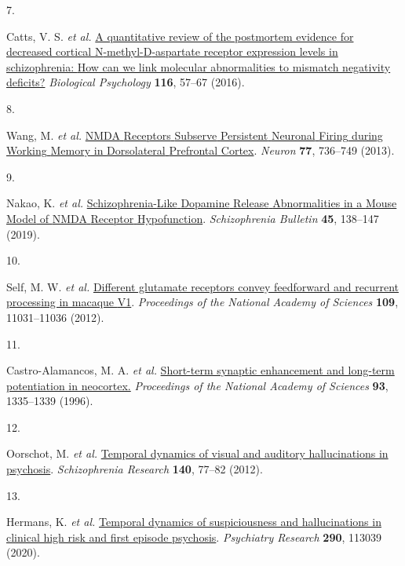 \documentclass[
]{article}
\newlength{\cslhangindent}
\newlength{\csllabelwidth}
\newlength{\cslentryspacingunit} %
\newenvironment{CSLReferences}[2] %
 {%
  \setlength{\parindent}{0pt}
  \ifodd #1
  \let\oldpar\par
  \def\par{\hangindent=\cslhangindent\oldpar}
  \fi
  \setlength{\parskip}{#2\cslentryspacingunit}
 }%
 {}
\newcommand{\CSLLeftMargin}[1]{\parbox[t]{\csllabelwidth}{#1}}
\newcommand{\CSLRightInline}[1]{\parbox[t]{\linewidth - \csllabelwidth}{#1}\break}
\begin{document}
\begin{CSLReferences}{0}{0}
\leavevmode{}%
\CSLLeftMargin{7. }%
\CSLRightInline{Catts, V. S. \emph{et al.}
\href{https://doi.org/10.1016/j.biopsycho.2015.10.013}{A quantitative
review of the postmortem evidence for decreased cortical
{N}-methyl-{D}-aspartate receptor expression levels in schizophrenia:
{How} can we link molecular abnormalities to mismatch negativity
deficits?} \emph{Biological Psychology} \textbf{116}, 57--67 (2016).}

\leavevmode{}%
\CSLLeftMargin{8. }%
\CSLRightInline{Wang, M. \emph{et al.}
\href{https://doi.org/10.1016/j.neuron.2012.12.032}{{NMDA} {Receptors}
{Subserve} {Persistent} {Neuronal} {Firing} during {Working} {Memory} in
{Dorsolateral} {Prefrontal} {Cortex}}. \emph{Neuron} \textbf{77},
736--749 (2013).}

\leavevmode{}%
\CSLLeftMargin{9. }%
\CSLRightInline{Nakao, K. \emph{et al.}
\href{https://doi.org/10.1093/schbul/sby003}{Schizophrenia-{Like}
{Dopamine} {Release} {Abnormalities} in a {Mouse} {Model} of {NMDA}
{Receptor} {Hypofunction}}. \emph{Schizophrenia Bulletin} \textbf{45},
138--147 (2019).}

\leavevmode{}%
\CSLLeftMargin{10. }%
\CSLRightInline{Self, M. W. \emph{et al.}
\href{https://doi.org/10.1073/pnas.1119527109}{Different glutamate
receptors convey feedforward and recurrent processing in macaque {V1}}.
\emph{Proceedings of the National Academy of Sciences} \textbf{109},
11031--11036 (2012).}

\leavevmode{}%
\CSLLeftMargin{11. }%
\CSLRightInline{Castro-Alamancos, M. A. \emph{et al.}
\href{https://doi.org/10.1073/pnas.93.3.1335}{Short-term synaptic
enhancement and long-term potentiation in neocortex.} \emph{Proceedings
of the National Academy of Sciences} \textbf{93}, 1335--1339 (1996).}

\leavevmode{}%
\CSLLeftMargin{12. }%
\CSLRightInline{Oorschot, M. \emph{et al.}
\href{https://doi.org/10.1016/j.schres.2012.06.010}{Temporal dynamics of
visual and auditory hallucinations in psychosis}. \emph{Schizophrenia
Research} \textbf{140}, 77--82 (2012).}

\leavevmode{}%
\CSLLeftMargin{13. }%
\CSLRightInline{Hermans, K. \emph{et al.}
\href{https://doi.org/10.1016/j.psychres.2020.113039}{Temporal dynamics
of suspiciousness and hallucinations in clinical high risk and first
episode psychosis}. \emph{Psychiatry Research} \textbf{290}, 113039
(2020).}


\end{CSLReferences}
\end{document}
